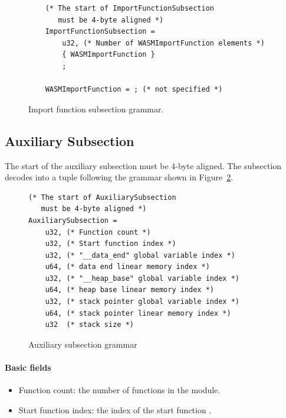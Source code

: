 \documentclass{article}
\begin{document}
\begin{figure}[H]
\begin{verbatim}
    (* The start of ImportFunctionSubsection
       must be 4-byte aligned *)
    ImportFunctionSubsection =
        u32, (* Number of WASMImportFunction elements *)
        { WASMImportFunction }
        ;

    WASMImportFunction = ; (* not specified *)
\end{verbatim}
\caption{Import function subsection grammar.}
\label{fig:import-function-subsection-grammar}
\end{figure}



\subsection{Auxiliary Subsection}
\label{section:init-data-auxiliary}

The start of the auxiliary subsection must be 4-byte aligned.
The subsection decodes into a tuple following the grammar shown in
Figure~\ref{fig:auxiliary-subsection-grammar}.

\begin{figure}[H]
\begin{verbatim}
(* The start of AuxiliarySubsection
   must be 4-byte aligned *)
AuxiliarySubsection =
    u32, (* Function count *)
    u32, (* Start function index *)
    u32, (* "__data_end" global variable index *)
    u64, (* data end linear memory index *)
    u32, (* "__heap_base" global variable index *)
    u64, (* heap base linear memory index *)
    u32, (* stack pointer global variable index *)
    u64, (* stack pointer linear memory index *)
    u32  (* stack size *)
\end{verbatim}
\caption{Auxiliary subsection grammar}
\label{fig:auxiliary-subsection-grammar}
\end{figure}

\paragraph{Basic fields}

\begin{itemize}
\item Function count: the number of functions in the module.
\item Start function index: the index of the start function
      \cite[Sec.~5.5.11]{webassembly2019core}.
\end{itemize}
\end{document}
